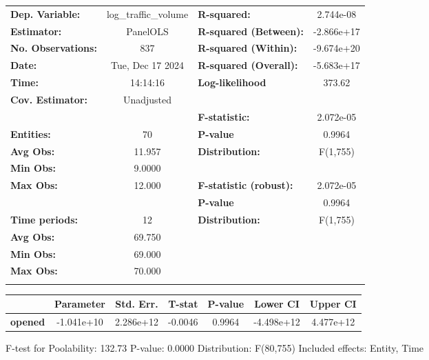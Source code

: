 \begin{center}
\begin{tabular}{lclc}
\toprule
\textbf{Dep. Variable:}    & log\_traffic\_volume & \textbf{  R-squared:         }   &    2.744e-08     \\
\textbf{Estimator:}        &       PanelOLS       & \textbf{  R-squared (Between):}  &    -2.866e+17    \\
\textbf{No. Observations:} &         837          & \textbf{  R-squared (Within):}   &    -9.674e+20    \\
\textbf{Date:}             &   Tue, Dec 17 2024   & \textbf{  R-squared (Overall):}  &    -5.683e+17    \\
\textbf{Time:}             &       14:14:16       & \textbf{  Log-likelihood     }   &      373.62      \\
\textbf{Cov. Estimator:}   &      Unadjusted      & \textbf{                     }   &                  \\
\textbf{}                  &                      & \textbf{  F-statistic:       }   &    2.072e-05     \\
\textbf{Entities:}         &          70          & \textbf{  P-value            }   &      0.9964      \\
\textbf{Avg Obs:}          &        11.957        & \textbf{  Distribution:      }   &     F(1,755)     \\
\textbf{Min Obs:}          &        9.0000        & \textbf{                     }   &                  \\
\textbf{Max Obs:}          &        12.000        & \textbf{  F-statistic (robust):} &    2.072e-05     \\
\textbf{}                  &                      & \textbf{  P-value            }   &      0.9964      \\
\textbf{Time periods:}     &          12          & \textbf{  Distribution:      }   &     F(1,755)     \\
\textbf{Avg Obs:}          &        69.750        & \textbf{                     }   &                  \\
\textbf{Min Obs:}          &        69.000        & \textbf{                     }   &                  \\
\textbf{Max Obs:}          &        70.000        & \textbf{                     }   &                  \\
\textbf{}                  &                      & \textbf{                     }   &                  \\
\bottomrule
\end{tabular}
\begin{tabular}{lcccccc}
                & \textbf{Parameter} & \textbf{Std. Err.} & \textbf{T-stat} & \textbf{P-value} & \textbf{Lower CI} & \textbf{Upper CI}  \\
\midrule
\textbf{opened} &     -1.041e+10     &     2.286e+12      &     -0.0046     &      0.9964      &     -4.498e+12    &     4.477e+12      \\
\bottomrule
\end{tabular}
\end{center}

F-test for Poolability: 132.73 \newline
 P-value: 0.0000 \newline
 Distribution: F(80,755) \newline
  \newline
 Included effects: Entity, Time